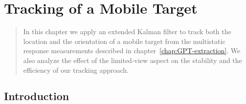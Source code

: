 \def\chapname{Tracking of a Mobile Target}
\chapter[\chapname]
{\chapname {}}

\label{chap:tracking}

\begin{abstract}
In this chapter we apply an extended Kalman filter to track both the
location and the orientation of a mobile target from the multistatic
response measurements described in chapter~\ref{chap:GPT-extraction}.
We also analyze the effect of the
limited-view aspect on the stability and the efficiency of our
tracking approach.
\end{abstract}



\section{Introduction}
\label{sec:intro}

